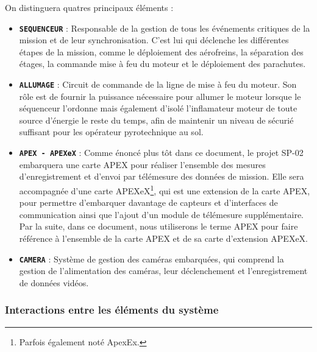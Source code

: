 On distinguera quatres principaux éléments :
\begin{itemize}
    \item \textbf{\texttt{SEQUENCEUR}} : Responsable de la gestion de tous les événements critiques de la mission et de leur
    synchronisation. C'est lui qui déclenche les différentes étapes de la mission, comme le déploiement des aérofreins, la
    séparation des étages, la commande mise à feu du moteur et le déploiement des parachutes.
    \item \textbf{\texttt{ALLUMAGE}} : Circuit de commande de la ligne de mise à feu du moteur. Son rôle est de fournir la
    puissance nécessaire pour allumer le moteur lorsque le séquenceur l'ordonne mais également d'isolé l'inflamateur moteur de toute
    source d'énergie le reste du temps, afin de maintenir un niveau de sécurié suffisant pour les opérateur pyrotechnique au sol.
    \item \textbf{\texttt{APEX - APEXeX}} : Comme énoncé plus tôt dans ce document, le projet SP-02 embarquera une carte APEX pour
    réaliser l'ensemble des mesures d'enregistrement et d'envoi par télémesure des données de mission. Elle sera accompagnée
    d'une carte APEXeX\footnote{Parfois également noté ApexEx.}, qui est une extension de la carte APEX, pour permettre
    d'embarquer davantage de capteurs et d'interfaces de communication ainsi que l'ajout d'un module de télémesure supplémentaire.
    Par la suite, dans ce document, nous utiliserons le terme APEX pour faire référence à l'ensemble de la carte APEX et de sa
    carte d'extension APEXeX.
    \item \textbf{\texttt{CAMERA}} : Système de gestion des caméras embarquées, qui comprend la gestion de l'alimentation des
    caméras, leur déclenchement et l'enregistrement de données vidéos.
\end{itemize}

\vspace{-0.3cm}

\subsubsection{Interactions entre les éléments du système}

